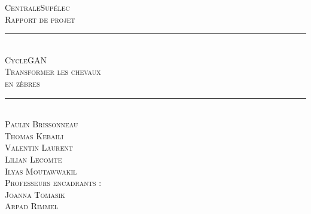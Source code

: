 \documentclass[a4paper]{report}
\newcommand{\HRule}{\rule{\linewidth}{0.5mm}}
\begin{document}
\begin{titlepage}
  \begin{sffamily}
  \begin{center}

    \textsc{\Large CentraleSupélec}\\[2cm]
    
    \textsc{\huge Rapport de projet}\\[1cm]

	\HRule \\[0.55cm]
    \textsc{\Huge CycleGAN \\[0.2cm] \huge Transformer les chevaux\\en zèbres}\\[0.6cm]
	\HRule \\[3cm]
    
 
  
    \textsc{\large Paulin Brissonneau\\
    	Thomas Kebaili\\
    	Valentin Laurent\\
    	Lilian Lecomte\\
    	Ilyas Moutawwakil}\\[1cm]
        
    \textsc{\large Professeurs encadrants :\\
        Joanna Tomasik\\
        Arpad Rimmel}\\


    \vfill

  \end{center}
  \end{sffamily}
\end{titlepage}



\tableofcontents








\newpage

%
%
%
\end{document}
